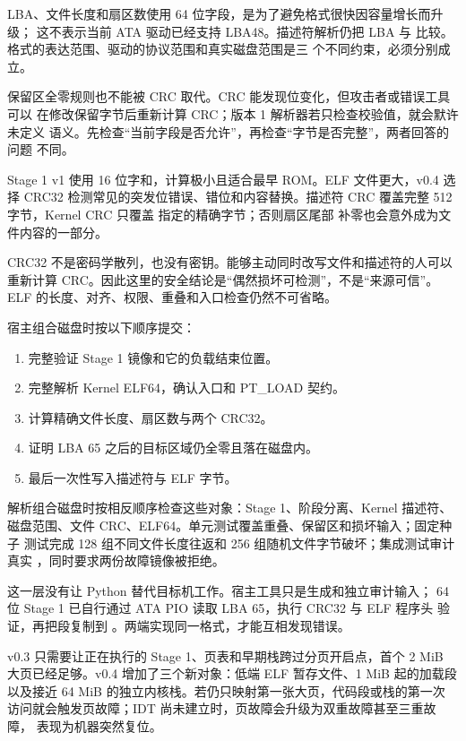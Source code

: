 LBA、文件长度和扇区数使用 64 位字段，是为了避免格式很快因容量增长而升级；
这不表示当前 ATA 驱动已经支持 LBA48。描述符解析仍把 LBA 与
 比较。格式的表达范围、驱动的协议范围和真实磁盘范围是三
个不同约束，必须分别成立。

保留区全零规则也不能被 CRC 取代。CRC 能发现位变化，但攻击者或错误工具可以
在修改保留字节后重新计算 CRC；版本 1 解析器若只检查校验值，就会默许未定义
语义。先检查“当前字段是否允许”，再检查“字节是否完整”，两者回答的问题
不同。

Stage 1 v1 使用 16 位字和，计算极小且适合最早 ROM。ELF 文件更大，v0.4
选择 CRC32 检测常见的突发位错误、错位和内容替换。描述符 CRC 覆盖完整
512 字节，Kernel CRC 只覆盖  指定的精确字节；否则扇区尾部
补零也会意外成为文件内容的一部分。

CRC32 不是密码学散列，也没有密钥。能够主动同时改写文件和描述符的人可以
重新计算 CRC。因此这里的安全结论是“偶然损坏可检测”，不是“来源可信”。
ELF 的长度、对齐、权限、重叠和入口检查仍然不可省略。

宿主组合磁盘时按以下顺序提交：

\begin{enumerate}[label=\arabic*.]
  \item 完整验证 Stage 1 镜像和它的负载结束位置。
  \item 完整解析 Kernel ELF64，确认入口和 PT\_LOAD 契约。
  \item 计算精确文件长度、扇区数与两个 CRC32。
  \item 证明 LBA 65 之后的目标区域仍全零且落在磁盘内。
  \item 最后一次性写入描述符与 ELF 字节。
\end{enumerate}

解析组合磁盘时按相反顺序检查这些对象：Stage 1、阶段分离、Kernel 描述符、
磁盘范围、文件 CRC、ELF64。单元测试覆盖重叠、保留区和损坏输入；固定种子
测试完成 128 组不同文件长度往返和 256 组随机文件字节破坏；集成测试审计
真实 ，同时要求两份故障镜像被拒绝。

这一层没有让 Python 替代目标机工作。宿主工具只是生成和独立审计输入；
64 位 Stage 1 已自行通过 ATA PIO 读取 LBA 65，执行 CRC32 与 ELF 程序头
验证，再把段复制到 。两端实现同一格式，才能互相发现错误。

v0.3 只需要让正在执行的 Stage 1、页表和早期栈跨过分页开启点，首个 2 MiB
大页已经足够。v0.4 增加了三个新对象：低端 ELF 暂存文件、1 MiB 起的加载段
以及接近 64 MiB 的独立内核栈。若仍只映射第一张大页，代码段或栈的第一次
访问就会触发页故障；IDT 尚未建立时，页故障会升级为双重故障甚至三重故障，
表现为机器突然复位。

